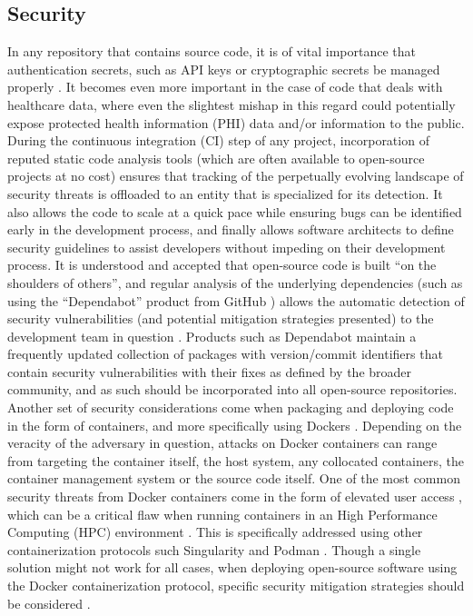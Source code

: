 \documentclass{article}
\begin{document}
\subsection{Security}
In any repository that contains source code, it is of vital importance that authentication secrets, such as API keys or cryptographic secrets be managed properly \cite{merkel_docker_nodate}. It becomes even more important in the case of code that deals with healthcare data, where even the slightest mishap in this regard could potentially expose protected health information (PHI) data and/or information to the public. During the continuous integration (CI) step of any project, incorporation of reputed static code analysis tools \cite{louridas_static_2006, ludwig_compiling_2017} (which are often available to open-source projects at no cost) ensures that tracking of the perpetually evolving landscape of security threats is offloaded to an entity that is specialized for its detection. It also allows the code to scale at a quick pace while ensuring bugs can be identified early in the development process, and finally allows software architects to define security guidelines to assist developers without impeding on their development process.
It is understood and accepted that open-source code is built “on the shoulders of others”, and regular analysis of the underlying dependencies (such as using the “Dependabot” product from GitHub \cite{noauthor_dependabot_nodate}) allows the automatic detection of security vulnerabilities (and potential mitigation strategies presented) to the development team in question \cite{alfadel_use_2021}. Products such as Dependabot maintain a frequently updated collection of packages with version/commit identifiers that contain security vulnerabilities with their fixes as defined by the broader community, and as such should be incorporated into all open-source repositories. Another set of security considerations come when packaging and deploying code in the form of containers, and more specifically using Dockers \cite{merkel_docker_nodate}. Depending on the veracity of the adversary in question, attacks on Docker containers can range from targeting the container itself, the host system, any collocated containers, the container management system or the source code itself\cite{combe_docker_2016}. One of the most common security threats from Docker containers come in the form of elevated user access \cite{combe_docker_2016, bui_analysis_2015}, which can be a critical flaw when running containers in an High Performance Computing (HPC) environment \cite{sparks_enabling_2019, bacis_dockerpolicymodules_2015}. This is specifically addressed using other containerization protocols such Singularity \cite{kurtzer_singularity_2017} and Podman \cite{gantikow_rootless_2020}. Though a single solution might not work for all cases, when deploying open-source software using the Docker containerization protocol, specific security mitigation strategies should be considered \cite{yasrab_mitigating_2021}.
\end{document}
